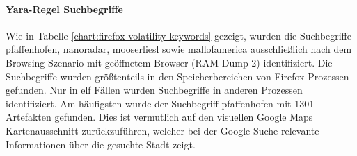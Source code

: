 \paragraph*{Yara-Regel \grqq{}Suchbegriffe\grqq{}}
Wie in Tabelle \ref{chart:firefox-volatility-keywords} gezeigt, wurden die Suchbegriffe \grqq{}pfaffenhofen\grqq{}, \grqq{}nanoradar\grqq{}, \grqq{}mooserliesl\grqq{} sowie \grqq{}mallofamerica\grqq{} ausschließlich nach dem Browsing-Szenario mit geöffnetem Browser (RAM Dump 2) identifiziert. Die Suchbegriffe wurden größtenteils in den Speicherbereichen von Firefox-Prozessen gefunden. Nur in elf Fällen wurden Suchbegriffe in anderen Prozessen identifiziert. Am häufigsten wurde der Suchbegriff \grqq{}pfaffenhofen\grqq{} mit 1301 Artefakten gefunden. Dies ist vermutlich auf den  visuellen Google Maps Kartenausschnitt zurückzuführen, welcher bei der Google-Suche relevante Informationen über die gesuchte Stadt zeigt. 


